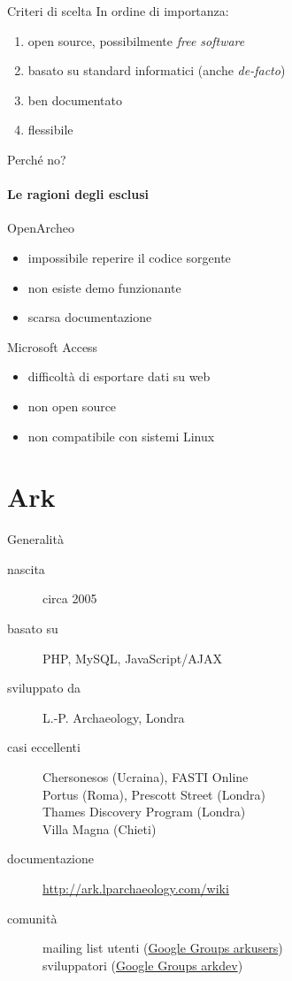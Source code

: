 \documentclass{beamer}
\begin{document}
		\begin{frame}{Criteri di scelta}
			In ordine di importanza:
			\begin{enumerate}
				\item open source, possibilmente \emph{free software}
				\item basato su standard informatici (anche \emph{de-facto})
				\item ben documentato
				\item flessibile
			\end{enumerate}
		\end{frame}

		\begin{frame}{Perché no?}
		\framesubtitle{Le ragioni degli esclusi}
			\begin{multicols}{2}[][]
				OpenArcheo
				\begin{itemize}
					\item impossibile reperire il codice sorgente
					\item non esiste demo funzionante
					\item scarsa documentazione
				\end{itemize}
				\columnbreak
				Microsoft Access
				\begin{itemize}
					\item difficoltà di esportare dati su web
					\item non open source
					\item non compatibile con sistemi Linux
				\end{itemize}
			\end{multicols}
		\end{frame}

	\section{Ark}

		\begin{frame}{Generalità}
			\begin{description}
				\item[nascita] circa 2005
				\item[basato su] PHP, MySQL, JavaScript/AJAX
				\item[sviluppato da] L.-P. Archaeology, Londra
				\item[casi eccellenti] Chersonesos (Ucraina), FASTI Online\\Portus (Roma), Prescott Street (Londra)\\Thames Discovery Program (Londra)\\Villa Magna (Chieti)
				\item[documentazione] \url{http://ark.lparchaeology.com/wiki}
				\item[comunità] mailing list utenti (\href{http://groups.google.com/group/arkusers}{Google Groups arkusers})\\sviluppatori (\href{http://groups.google.com/group/arkdev}{Google Groups arkdev})
			\end{description}
		\end{frame}
\end{document}
